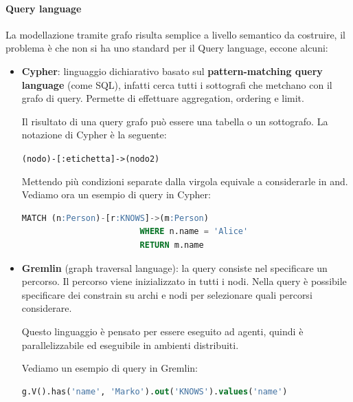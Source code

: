       \paragraph{Query language}
      La modellazione tramite grafo risulta semplice a livello semantico da costruire,
      il problema è che non si ha uno standard per il Query language, eccone alcuni:
      \begin{itemize}
            \item \textbf{Cypher}: linguaggio dichiarativo basato sul \textbf{
                        pattern-matching query language} (come SQL), infatti
                  cerca tutti i sottografi che metchano con il grafo di query.
                  Permette di effettuare aggregation, ordering e limit.

                  Il risultato di una query grafo può essere una tabella o un
                  sottografo. La notazione di Cypher è la seguente:
                  \begin{center}
                        \texttt{(nodo)-[:etichetta]->(nodo2)}
                  \end{center}
                  Mettendo più condizioni separate dalla virgola equivale a
                  considerarle in and. Vediamo ora un esempio di query in Cypher:
                  \begin{lstlisting}[language=SQL]
                        MATCH (n:Person)-[r:KNOWS]->(m:Person)
                        WHERE n.name = 'Alice'
                        RETURN m.name
                  \end{lstlisting}
            \item \textbf{Gremlin} (graph traversal language): la query consiste
                  nel specificare un percorso. Il percorso viene inizializzato in
                  tutti i nodi. Nella query è possibile specificare dei constrain
                  su archi e nodi per selezionare quali percorsi considerare.

                  Questo linguaggio è pensato per essere eseguito ad agenti,
                  quindi è parallelizzabile ed eseguibile in ambienti distribuiti.

                  Vediamo un esempio di query in Gremlin:
                  \begin{lstlisting}[language=SQL]
                        g.V().has('name', 'Marko').out('KNOWS').values('name')
                  \end{lstlisting}
      \end{itemize}

